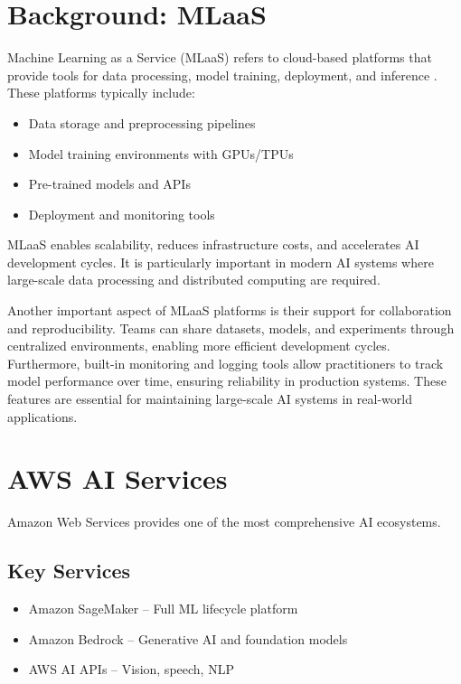 \documentclass[conference]{IEEEtran}
\begin{document}
	\section{Background: MLaaS}
	Machine Learning as a Service (MLaaS) refers to cloud-based platforms that provide tools for data processing, model training, deployment, and inference \cite{mlaas_survey}. These platforms typically include:
	
	\begin{itemize}
		\item Data storage and preprocessing pipelines
		\item Model training environments with GPUs/TPUs
		\item Pre-trained models and APIs
		\item Deployment and monitoring tools
	\end{itemize}
	
	MLaaS enables scalability, reduces infrastructure costs, and accelerates AI development cycles. It is particularly important in modern AI systems where large-scale data processing and distributed computing are required.
	
	Another important aspect of MLaaS platforms is their support for collaboration and reproducibility. Teams can share datasets, models, and experiments through centralized environments, enabling more efficient development cycles. Furthermore, built-in monitoring and logging tools allow practitioners to track model performance over time, ensuring reliability in production systems. These features are essential for maintaining large-scale AI systems in real-world applications.
	
	\section{AWS AI Services}
	Amazon Web Services provides one of the most comprehensive AI ecosystems.
	
	\subsection{Key Services}
	\begin{itemize}
		\item Amazon SageMaker – Full ML lifecycle platform
		\item Amazon Bedrock – Generative AI and foundation models
		\item AWS AI APIs – Vision, speech, NLP
	\end{itemize}
	
\end{document}
